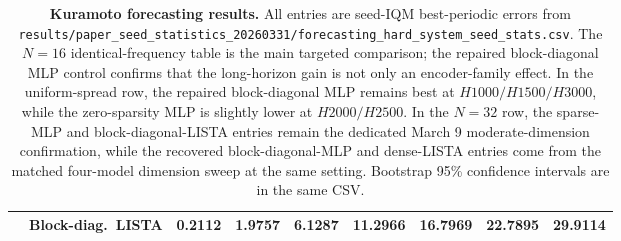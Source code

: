 \begin{table}[ht]
\begin{tabular}{p{}p{}rrrrrrr}
& Block-diag.\ LISTA & 0.2112 & 1.9757 & 6.1287 & 11.2966 & 16.7969 & 22.7895 & 29.9114 \\
\bottomrule
\end{tabular}
\caption{\textbf{Kuramoto forecasting results.} All entries are seed-IQM best-periodic errors from \texttt{results/paper\_seed\_statistics\_20260331/forecasting\_hard\_system\_seed\_stats.csv}. The $N=16$ identical-frequency table is the main targeted comparison; the repaired block-diagonal MLP control confirms that the long-horizon gain is not only an encoder-family effect. In the uniform-spread row, the repaired block-diagonal MLP remains best at $H1000/H1500/H3000$, while the zero-sparsity MLP is slightly lower at $H2000/H2500$. In the $N=32$ row, the sparse-MLP and block-diagonal-LISTA entries remain the dedicated March 9 moderate-dimension confirmation, while the recovered block-diagonal-MLP and dense-LISTA entries come from the matched four-model dimension sweep at the same setting. Bootstrap 95\% confidence intervals are in the same CSV.}
\label{tab:review-hard-kuramoto-20260314}
\end{table}

